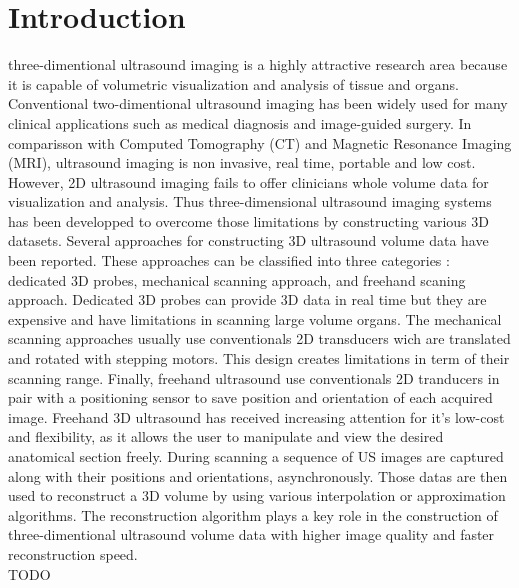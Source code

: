\documentclass[12pt,journal,compsoc]{IEEEtran}
\begin{document}
\section{Introduction}

 three-dimentional ultrasound imaging is a highly attractive research area because it is capable of volumetric visualization and analysis of tissue and organs. Conventional two-dimentional ultrasound imaging has been widely used for many clinical applications such as medical diagnosis and image-guided surgery. In comparisson with Computed Tomography (CT) and Magnetic Resonance Imaging (MRI), ultrasound imaging is non invasive, real time, portable and low cost. However, 2D ultrasound imaging fails to offer clinicians whole volume data for visualization and analysis. Thus three-dimensional ultrasound imaging systems has been developped to overcome those limitations by constructing various 3D datasets. Several approaches for constructing 3D ultrasound volume data have been reported. These approaches can be classified into three categories : dedicated 3D probes, mechanical scanning approach, and freehand scaning approach. 
Dedicated 3D probes can provide 3D data in real time but they are expensive and have limitations in scanning large volume organs.
The mechanical scanning approaches usually use conventionals 2D transducers wich are translated and rotated with stepping motors. This design creates limitations in term of their scanning range. 
Finally, freehand ultrasound use conventionals 2D tranducers in pair with a positioning sensor to save position and orientation of each acquired image.
Freehand 3D ultrasound has received increasing attention for it's low-cost and flexibility, as it allows the user to manipulate and view the desired anatomical section freely.
During scanning a sequence of US images are captured along with their positions and orientations, asynchronously. Those datas are then used to reconstruct a 3D volume by using various interpolation or approximation algorithms. The reconstruction algorithm plays a key role in the construction of three-dimentional ultrasound volume data with higher image quality and faster reconstruction speed.\\

TODO\\
\end{document}
